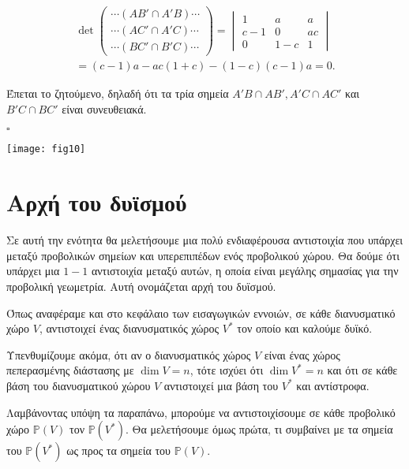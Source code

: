 \documentclass[12pt, a4paper]{book}
\begin{document}
\begin{displaymath}
\begin{split}
\det 
\begin{pmatrix} \cdots (AB' \cap A'B) \cdots \\\cdots (AC' \cap A'C)\cdots \\\cdots (BC' \cap B'C)\cdots 
\end{pmatrix} =
\begin{vmatrix}1&a&a\\c-1&0&ac\\0&1-c&1 
\end{vmatrix} \\
=(c-1)a-ac(1+c)-(1-c)(c-1)a = 0.
\end{split}
\end{displaymath}

Έπεται το ζητούμενο, δηλαδή ότι τα τρία σημεία $A'B \cap AB', A'C \cap AC'$ και \\ $B'C \cap BC'$ είναι συνευθειακά.
  \begin{flushright}
  $\square$
  \end{flushright} 
  
\begin{center}
\texttt{[image: fig10]}
\end{center}

\section{Αρχή του δυϊσμού}

Σε αυτή την ενότητα θα μελετήσουμε μια πολύ ενδιαφέρουσα αντιστοιχία που υπάρχει μεταξύ προβολικών σημείων και υπερεπιπέδων ενός προβολικού χώρου. Θα δούμε ότι υπάρχει μια $1-1$ αντιστοιχία μεταξύ αυτών, η οποία είναι μεγάλης σημασίας για την προβολική γεωμετρία. Αυτή ονομάζεται αρχή του δυϊσμού.

Όπως αναφέραμε και στο κεφάλαιο των εισαγωγικών εννοιών, σε κάθε διανυσματικό χώρο $V$, αντιστοιχεί ένας διανυσματικός χώρος $V^*$ τον οποίο και καλούμε δυϊκό.

Υπενθυμίζουμε ακόμα, ότι αν ο διανυσματικός χώρος $V$ είναι ένας χώρος πεπερασμένης διάστασης με $\dim{V} =n$, τότε ισχύει ότι $\dim{V^*} = n$ και ότι σε κάθε βάση του διανυσματικού χώρου $V$ αντιστοιχεί μια βάση του $V^*$ και αντίστροφα.

Λαμβάνοντας υπόψη τα παραπάνω, μπορούμε να αντιστοιχίσουμε σε κάθε προβολικό χώρο $\mathbb{P}(V)$ τον $\mathbb{P}(V^*)$. Θα μελετήσουμε όμως πρώτα, τι συμβαίνει με τα σημεία του $\mathbb{P}(V^*)$ ως προς τα σημεία του $\mathbb{P}(V)$.
\end{document}
